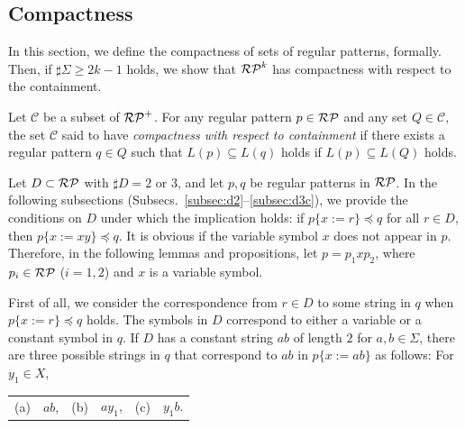 \subsection{Compactness}\label{subsec:compactness}

In this section, we define the compactness of sets of regular patterns, formally.
Then, if $\sharp\Sigma \ge 2k-1$ holds, 
we show that 
$\mathcal{RP}^{k}$ has compactness with respect to the containment.

\begin{dfn}\label{def:compactness}
Let $\mathcal{C}$ be a subset of $\mathcal{RP}^{+}$. 
For any regular pattern $p \in \mathcal{RP}$ and any set $Q \in \mathcal{C}$,
the set $\mathcal{C}$ said to have {\it compactness with respect to containment}
if there exists a regular pattern $q \in Q$ such that $L(p) \subseteq L(q)$ holds if $L(p) \subseteq L(Q)$ holds.
\end{dfn}

Let $D \subset \mathcal{RP}$ with $\sharp D = 2$ or $3$, and let $p,q$ be regular patterns in $\mathcal{RP}$.
In the following subsections (Subsecs.~\ref{subsec:d2}--\ref{subsec:d3c}), we provide the conditions on $D$ under which the implication holds: if $p \{ x := r \} \preceq q$ for all $r \in D$, then $p \{ x := xy \} \preceq q$.
It is obvious if the variable symbol $x$ does not appear in $p$.
Therefore, in the following lemmas and propositions, let $p=p_{1}xp_{2}$, where $p_{i}\in \mathcal{RP}$ ($i=1,2$) and $x$ is a variable symbol.

First of all, we consider the correspondence from $r\in D$ to some string in $q$ when $p \{ x := r \} \preceq q$ holds.
The symbols in $D$ correspond to either a variable or a constant symbol in $q$.
If $D$ has a constant string $ab$ of length $2$ for $a,b\in\Sigma$, there are three possible strings in $q$ that correspond to $ab$ in $p\{x:=ab\}$ as follows: For $y_{1} \in X$,
  \begin{center}
    \begin{tabular}{cccccc}
      \textrm{(a)} & $ab$, & \textrm{(b)} & $ay_{1}$, & \textrm{(c)} & $y_{1}b$.
    \end{tabular}
  \end{center}

